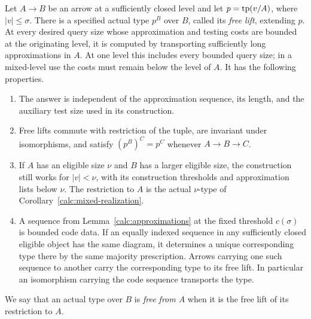 \begin{theorem}
\label{calc:free-extension}
Let $A\to B$ be an arrow at a sufficiently closed level and let
$p=\operatorname{tp}(v/A)$, where $|v|\le\sigma$.  There is a specified actual type
$p^B$ over $B$, called its \emph{free lift}, extending $p$.  At every
desired query size whose approximation and testing costs are bounded at
the originating level, it is computed by transporting sufficiently long
approximations in $A$.  At one level this includes every bounded query
size; in a mixed-level use the costs must remain below the level of $A$.
It has the following properties.
\begin{enumerate}
\item The answer is independent of the approximation sequence, its
length, and the auxiliary test size used in its construction.
\item Free lifts commute with restriction of the tuple, are invariant
under isomorphisms, and satisfy
$(p^B)^C=p^C$ whenever $A\to B\to C$.
\item If $A$ has an eligible size $\nu$ and $B$ has a larger eligible
size, the construction still works for $|v|<\nu$, with its construction
thresholds and approximation lists below $\nu$.  The restriction to
$A$ is the actual $\nu$-type of
Corollary~\ref{calc:mixed-realization}.
\item A sequence from Lemma~\ref{calc:approximations} at the fixed
threshold $c(\sigma)$ is bounded code data.  If an equally indexed
sequence in any sufficiently closed eligible object has the same
diagram, it determines a unique corresponding type there by the same
majority prescription.  Arrows carrying one such sequence to another
carry the corresponding type to its free lift.  In particular an
isomorphism carrying the code sequence transports the type.
\end{enumerate}
We say that an actual type over $B$ is \emph{free from $A$} when it is
the free lift of its restriction to $A$.
\end{theorem}

